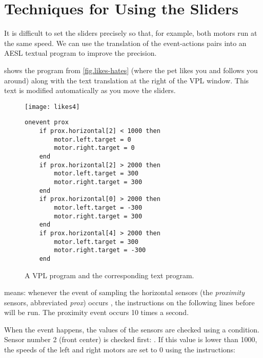 \chapter{Techniques for Using the Sliders}\label{a.tech}


It is difficult to set the sliders precisely so that, for example, both
motors run at the same speed. We can use the translation of the
event-actions pairs into an AESL textual program to improve the
precision.


 shows the program from
\cref{fig.likes-hates} (where the pet likes you and follows you around)
along with the text translation at the right of the VPL window. This
text is modified automatically as you move the sliders.

\begin{figure}[hbt]
\texttt{[image: likes4]}
\hfill
\begin{minipage}[b]{0.6\textwidth}
\footnotesize
\begin{lstlisting}
onevent prox
	if prox.horizontal[2] < 1000 then
		motor.left.target = 0
		motor.right.target = 0
	end
	if prox.horizontal[2] > 2000 then
		motor.left.target = 300
		motor.right.target = 300
	end
	if prox.horizontal[0] > 2000 then
		motor.left.target = -300
		motor.right.target = 300
	end
	if prox.horizontal[4] > 2000 then
		motor.left.target = 300
		motor.right.target = -300
	end
\end{lstlisting}
\end{minipage}
\caption{A VPL program and the corresponding text program.}
\label{fig.textcode}
\end{figure}

 means: whenever the event of sampling the horizontal
sensors (the \emph{proximity} sensors, abbreviated \emph{prox})
occurs , the instructions on the following lines before  will be
run. The proximity event occurs 10 times a second.

When the event happens, the values of the sensors are checked using a
condition. Sensor number 2 (front center) is checked first:
. If this value is lower than 1000, the speeds of
the left and right motors are set to 0 using the instructions:

